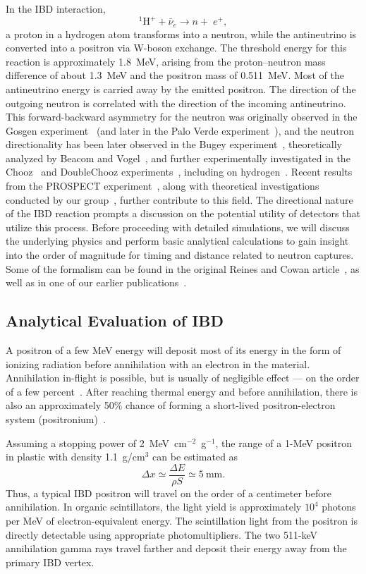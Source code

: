 \documentclass[tightenlines,twocolumn,prl,notitlepage,nofootinbib,preprintnumbers,longbibliography]{revtex4-1}
\begin{document}
In the IBD interaction,
\[
^1\mathrm{H}^+ + \bar\nu_e \to n + \;e^+,
\]
a proton in a hydrogen atom transforms into a neutron, while the antineutrino is converted into a positron via W-boson exchange. The threshold energy for this reaction is approximately 1.8~MeV, arising from the proton–neutron mass difference of about 1.3~MeV and the positron mass of 0.511~MeV. Most of the antineutrino energy is carried away by the emitted positron.
The direction of the outgoing neutron is correlated with the direction of the incoming antineutrino. This forward-backward asymmetry for the neutron was originally observed in the Gosgen experiment~\cite{Zacek:1984qi} (and later in the Palo Verde experiment~\cite{PaloVerde_direction}), and the neutron directionality has been later observed in the Bugey experiment~\cite{Cussonneau:1992lua}, theoretically analyzed by Beacom and Vogel~\cite{PhysRevD.60.053003}, and further experimentally investigated in the Chooz~\cite{PhysRevD.61.012001} and DoubleChooz experiments~\cite{Caden:2012bm}, including on hydrogen~\cite{Roncin:2014adw}. Recent results from the PROSPECT experiment~\cite{PhysRevD.111.032014}, along with theoretical investigations conducted by our group~\cite{Duvall:2024cae}, further contribute to this field.
The directional nature of the IBD reaction prompts a discussion on the potential utility of detectors that utilize this process. Before proceeding with detailed simulations, we will discuss the underlying physics and perform basic analytical calculations to gain insight into the order of magnitude for timing and distance related to neutron captures. Some of the formalism can be found in the original Reines and Cowan article~\cite{Reines_RevSciIns1954}, as well as in one of our earlier publications~\cite{mTC:2016yys}.

\subsection{Analytical Evaluation of IBD}\label{subsec:analytical_eval}
A positron of a few MeV energy will deposit most of its energy in the form of ionizing radiation before annihilation with an electron in the material. Annihilation in-flight is possible, but is usually of negligible effect --- on the order of a few percent~\cite{2017EPJWC.14608010S}. After reaching thermal energy and before annihilation, there is also an approximately 50\% chance of forming a short-lived positron-electron system (positronium)~\cite{DoubleChooz:2014iyf}. 

Assuming a stopping power of 2~MeV~cm$^{-2}$~g$^{-1}$, the range of a 1-MeV positron in plastic with density 1.1~g/cm$^3$ can be estimated as
\[
\Delta x \simeq \frac{\Delta E}{\rho S} \simeq 5~\text{mm}.
\]
Thus, a typical IBD positron will travel on the order of a centimeter before annihilation. In organic scintillators, the light yield is approximately $10^4$ photons per MeV of electron-equivalent energy. The scintillation light from the positron is directly detectable using appropriate photomultipliers. The two 511-keV annihilation gamma rays travel farther and deposit their energy away from the primary IBD vertex.
 
\end{document}
